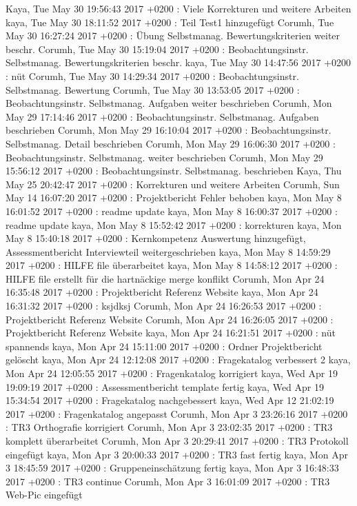 Kaya, Tue May 30 19:56:43 2017 +0200 : Viele Korrekturen und weitere Arbeiten
kaya, Tue May 30 18:11:52 2017 +0200 : Teil Test1 hinzugefügt
Corumh, Tue May 30 16:27:24 2017 +0200 : Übung Selbstmanag. Bewertungskriterien weiter beschr.
Corumh, Tue May 30 15:19:04 2017 +0200 : Beobachtungsinstr. Selbstmanag. Bewertungskriterien beschr.
kaya, Tue May 30 14:47:56 2017 +0200 : nüt
Corumh, Tue May 30 14:29:34 2017 +0200 : Beobachtungsinstr. Selbstmanag. Bewertung
Corumh, Tue May 30 13:53:05 2017 +0200 : Beobachtungsinstr. Selbstmanag. Aufgaben weiter beschrieben
Corumh, Mon May 29 17:14:46 2017 +0200 : Beobachtungsinstr. Selbstmanag. Aufgaben beschrieben
Corumh, Mon May 29 16:10:04 2017 +0200 : Beobachtungsinstr. Selbstmanag. Detail beschrieben
Corumh, Mon May 29 16:06:30 2017 +0200 : Beobachtungsinstr. Selbstmanag. weiter beschrieben
Corumh, Mon May 29 15:56:12 2017 +0200 : Beobachtungsinstr. Selbstmanag. beschrieben
Kaya, Thu May 25 20:42:47 2017 +0200 : Korrekturen und weitere Arbeiten
Corumh, Sun May 14 16:07:20 2017 +0200 : Projektbericht Fehler behoben
kaya, Mon May 8 16:01:52 2017 +0200 : readme update
kaya, Mon May 8 16:00:37 2017 +0200 : readme update
kaya, Mon May 8 15:52:42 2017 +0200 : korrekturen
kaya, Mon May 8 15:40:18 2017 +0200 : Kernkompetenz Auswertung hinzugefügt, Assessmentbericht Interviewteil weitergeschrieben
kaya, Mon May 8 14:59:29 2017 +0200 : HILFE file überarbeitet
kaya, Mon May 8 14:58:12 2017 +0200 : HILFE file erstellt für die hartnäckige merge konflikt
Corumh, Mon Apr 24 16:35:48 2017 +0200 : Projektbericht Referenz Website
kaya, Mon Apr 24 16:31:32 2017 +0200 : ksjdksj
Corumh, Mon Apr 24 16:26:53 2017 +0200 : Projektbericht Referenz Website
Corumh, Mon Apr 24 16:26:05 2017 +0200 : Projektbericht Referenz Website
kaya, Mon Apr 24 16:21:51 2017 +0200 : nüt spannends
kaya, Mon Apr 24 15:11:00 2017 +0200 : Ordner Projektbericht gelöscht
kaya, Mon Apr 24 12:12:08 2017 +0200 : Fragekatalog verbessert 2
kaya, Mon Apr 24 12:05:55 2017 +0200 : Fragenkatalog korrigiert
kaya, Wed Apr 19 19:09:19 2017 +0200 : Assessmentbericht template fertig
kaya, Wed Apr 19 15:34:54 2017 +0200 : Fragekatalog nachgebessert
kaya, Wed Apr 12 21:02:19 2017 +0200 : Fragenkatalog angepasst
Corumh, Mon Apr 3 23:26:16 2017 +0200 : TR3 Orthografie korrigiert
Corumh, Mon Apr 3 23:02:35 2017 +0200 : TR3 komplett überarbeitet
Corumh, Mon Apr 3 20:29:41 2017 +0200 : TR3 Protokoll eingefügt
kaya, Mon Apr 3 20:00:33 2017 +0200 : TR3 fast fertig
kaya, Mon Apr 3 18:45:59 2017 +0200 : Gruppeneinschätzung fertig
kaya, Mon Apr 3 16:48:33 2017 +0200 : TR3 continue
Corumh, Mon Apr 3 16:01:09 2017 +0200 : TR3 Web-Pic eingefügt
